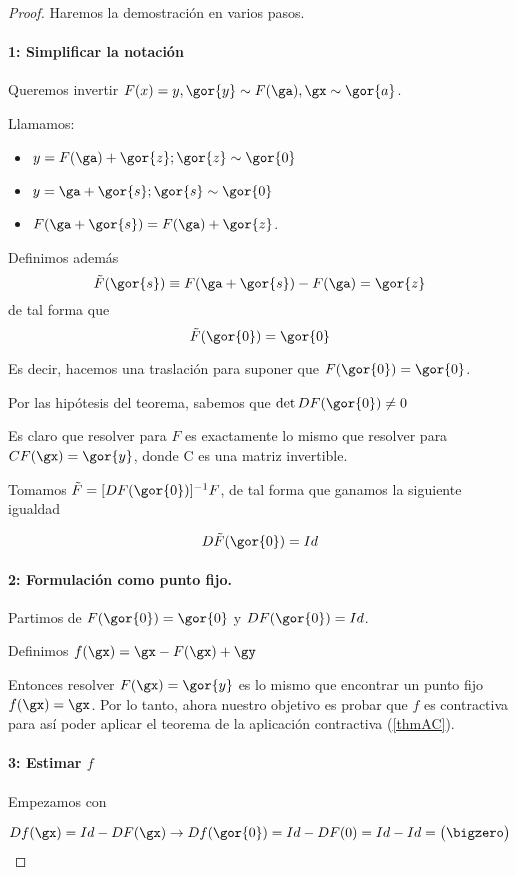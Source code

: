 \begin{proof} Haremos la demostración en varios pasos.

 \paragraph{1: Simplificar la notación}  Queremos invertir $F(x) = y, \gor{y} \sim F(\ga), \gx \sim \gor{a}$.
 
 Llamamos:
 \begin{itemize}
  \item $y = F(\ga) + \gor{z}; \gor{z} \sim \gor{0}$
  \item $y = \ga + \gor{s}; \gor{s} \sim \gor{0}$
\item  $F(\ga+\gor{s}) = F(\ga)+\gor{z}$.
  \end{itemize}
 Definimos además \[ \tilde{F}(\gor{s}) \equiv F(\ga + \gor{s}) - F(\ga) = \gor{z} \] de tal forma que  \[ \tilde{F}(\gor{0}) = \gor{0} \]
 
 Es decir, hacemos una traslación para suponer que $F(\gor{0}) = \gor{0}$.
 
 Por las hipótesis del teorema, sabemos que $\det DF(\gor{0}) \neq 0$
 
 Es claro que resolver para $F$ es exactamente lo mismo que resolver para $CF(\gx) = \gor{y}$, donde C es una matriz invertible.
 
 Tomamos $\tilde{F} = [DF(\gor{0})]^{-1}F$, de tal forma que ganamos la siguiente igualdad

 \[ D\tilde{F}(\gor{0}) = Id \]
 
 \paragraph{2: Formulación como punto fijo.}

 Partimos de $F(\gor{0})=\gor{0}$ y $ DF(\gor{0}) = Id$.
 
 Definimos $f(\gx) = \gx - F(\gx)+\gy$
 
 Entonces resolver $F(\gx) = \gor{y}$ es lo mismo que encontrar un punto fijo $f(\gx) = \gx$. Por lo tanto, ahora nuestro objetivo es probar que $f$ es contractiva para así poder aplicar el teorema de la aplicación contractiva (\ref{thmAC}).
 
 \paragraph{3: Estimar $f$} Empezamos con
 
 \[ Df(\gx) = Id - DF(\gx) \rightarrow Df(\gor{0}) = Id - DF(0) = Id - Id = \begin{pmatrix}  \bigzero \end{pmatrix}  \]
   

\end{proof}
